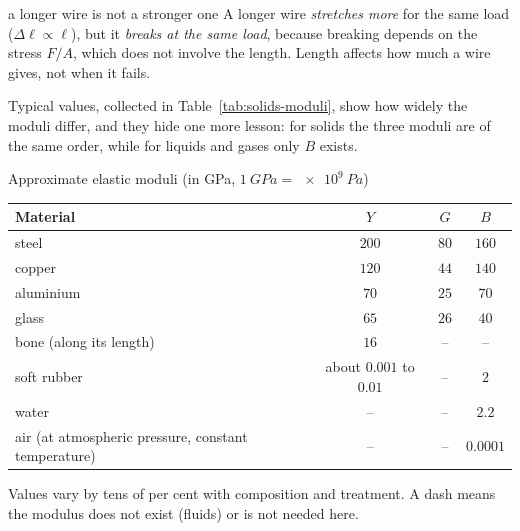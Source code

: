\begin{trapbox}{a longer wire is not a stronger one}
A longer wire \emph{stretches more} for the same load ($\Delta\ell\propto\ell$), but it \emph{breaks at
the same load}, because breaking depends on the stress $F/A$, which does not involve the length. Length
affects how much a wire gives, not when it fails.
\end{trapbox}

Typical values, collected in Table~\ref{tab:solids-moduli}, show how widely the moduli differ, and
they hide one more lesson: for solids the three moduli are of the same order, while for liquids and gases
only $B$ exists.

\begin{tablebox}{Approximate elastic moduli (in \si{GPa}, $\SI{1}{GPa}=\SI{e9}{Pa}$)}
\centering
\begin{tabular}{@{}lccc@{}}
\toprule
Material & $Y$ & $G$ & $B$\\
\midrule
steel & $200$ & $80$ & $160$\\
copper & $120$ & $44$ & $140$\\
aluminium & $70$ & $25$ & $70$\\
glass & $65$ & $26$ & $40$\\
bone (along its length) & $16$ & -- & --\\
soft rubber & about $0.001$ to $0.01$ & -- & $2$\\
water & -- & -- & $2.2$\\
air (at atmospheric pressure, constant temperature) & -- & -- & $0.0001$\\
\bottomrule
\end{tabular}\label{tab:solids-moduli}

\smallskip
\raggedright
Values vary by tens of per cent with composition and treatment. A dash means the modulus does not exist
(fluids) or is not needed here.
\end{tablebox}


